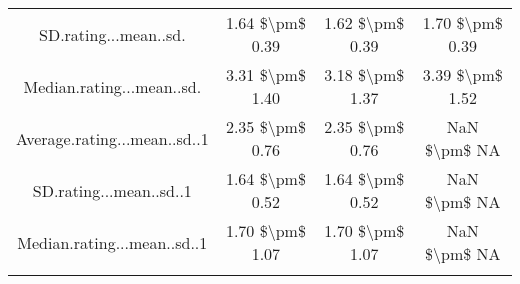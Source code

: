 \begin{table}[!htbp]
\begin{tabular}{@{\extracolsep{5pt}} cccc}
SD.rating...mean..sd. & 1.64 \$\textbackslash pm\$ 0.39 & 1.62 \$\textbackslash pm\$ 0.39 & 1.70 \$\textbackslash pm\$ 0.39 \\ 
Median.rating...mean..sd. & 3.31 \$\textbackslash pm\$ 1.40 & 3.18 \$\textbackslash pm\$ 1.37 & 3.39 \$\textbackslash pm\$ 1.52 \\ 
Average.rating...mean..sd..1 & 2.35 \$\textbackslash pm\$ 0.76 & 2.35 \$\textbackslash pm\$ 0.76 & NaN \$\textbackslash pm\$  NA \\ 
SD.rating...mean..sd..1 & 1.64 \$\textbackslash pm\$ 0.52 & 1.64 \$\textbackslash pm\$ 0.52 & NaN \$\textbackslash pm\$  NA \\ 
Median.rating...mean..sd..1 & 1.70 \$\textbackslash pm\$ 1.07 & 1.70 \$\textbackslash pm\$ 1.07 & NaN \$\textbackslash pm\$  NA \\ 
\hline \\[-1.8ex] 
\end{tabular} 
\end{table} 
